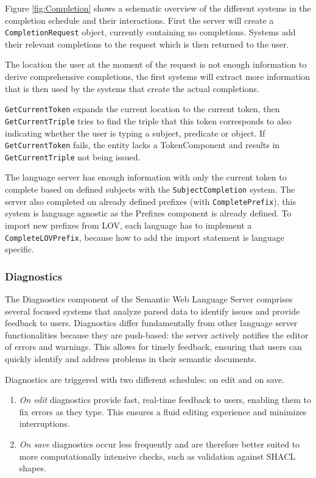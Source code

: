 Figure \ref{fig:Completion} shows a schematic overview of the different systems in the completion schedule and their interactions.
First the server will create a \texttt{CompletionRequest} object, currently containing no completions.
Systems add their relevant completions to the request which is then returned to the user.

The location the user at the moment of the request is not enough information to derive comprehensive completions, 
the first systems will extract more information that is then used by the systems that create the actual completions.

\texttt{GetCurrentToken} expands the current location to the current token, then \texttt{GetCurrentTriple} tries to find the triple that this token corresponds to also indicating whether the user is typing a subject, predicate or object.
If \texttt{GetCurrentToken} fails, the entity lacks a TokenComponent and results in \texttt{GetCurrentTriple} not being issued.

The language server has enough information with only the current token to complete based on defined subjects with the \texttt{SubjectCompletion} system.
The server also completed on already defined prefixes (with \texttt{CompletePrefix}), this system is language agnostic as the Prefixes component is already defined.
To import new prefixes from LOV, each language has to implement a \texttt{CompleteLOVPrefix}, because how to add the import statement is language specific.


\subsubsection{Diagnostics}

The Diagnostics component of the Semantic Web Language Server comprises several focused systems that analyze parsed data to identify issues and provide feedback to users.
Diagnostics differ fundamentally from other language server functionalities because they are push-based: the server actively notifies the editor of errors and warnings.
This allows for timely feedback, ensuring that users can quickly identify and address problems in their semantic documents.

Diagnostics are triggered with two different schedules: on edit and on save.

\begin{enumerate}
  \item \textit{On edit} diagnostics provide fast, real-time feedback to users, enabling them to fix errors as they type. 
    This ensures a fluid editing experience and minimizes interruptions.
  \item \textit{On save} diagnostics occur less frequently and are therefore better suited to more computationally intensive checks,
   such as validation against SHACL shapes.
\end{enumerate}

